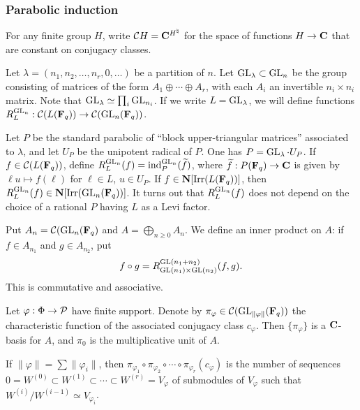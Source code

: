 \subsubsection{Parabolic induction}

For any finite group $H$, write $\mathcal{C} H=\mathbf{C}^{H^\natural}$ for the space of 
functions $H\to \mathbf{C}$ that are constant on conjugacy classes. 

Let $\lambda=(n_1,n_2,\dots,n_r,0,\dots)$ be a partition of $n$. 
Let $\operatorname{GL}_\lambda\subset \operatorname{GL}_n$ be the group consisting of 
matrices of the form $A_1\oplus \cdots \oplus A_r$, with each $A_i$ an 
invertible $n_i\times n_i$ matrix. Note that 
$\operatorname{GL}_\lambda\simeq \prod_i \operatorname{GL}_{n_i}$. If we write 
$L=\operatorname{GL}_\lambda$, we will define functions 
$R_L^{\operatorname{GL}_n}:\mathcal{C}(L(\mathbf{F}_q)) \to \mathcal{C}(\operatorname{GL}_n(\mathbf{F}_q))$. 

Let $P$ be the standard parabolic of ``block upper-triangular matrices'' 
associated to $\lambda$, and let $U_P$ be the unipotent radical of $P$. 
One has $P=\operatorname{GL}_\lambda \cdot U_P$. If 
$f\in \mathcal{C}(L(\mathbf{F}_q))$, define 
$R_L^{\operatorname{GL}_n}(f)=\operatorname{ind}_P^{\operatorname{GL}_n}(\widetilde f)$, 
where $\widetilde f:P(\mathbf{F}_q) \to \mathbf{C}$ is given by 
$\ell u\mapsto f(\ell)$ for $\ell\in L$, $u\in U_P$. If 
$f\in \mathbf{N}[\operatorname{Irr}(L(\mathbf{F}_q))]$, then 
$R_L^{\operatorname{GL}_n}(f)\in \mathbf{N}[\operatorname{Irr}(\operatorname{GL}_n(\mathbf{F}_q))]$. 
It turns out that $R_L^{\operatorname{GL}_n}(f)$ does not depend on the choice of 
a rational $P$ having $L$ as a Levi factor. 

Put $A_n = \mathcal{C}(\operatorname{GL}_n(\mathbf{F}_q)$ and $A=\bigoplus_{n\geqslant 0} A_n$. 
We define an inner product on $A$: if 
$f\in A_{n_1}$ and $g\in A_{n_2}$, put 
\[
  f\circ g = R_{\operatorname{GL}(n_1)\times \operatorname{GL}(n_2)}^{\operatorname{GL}(n_1+n_2)}(f,g) .
\]
This is commutative and associative.  

Let $\varphi:\Phi\to \mathcal{P}$ have finite support. Denote by 
$\pi_\varphi\in \mathcal{C}(\operatorname{GL}_{\|\varphi\|}(\mathbf{F}_q))$ the characteristic 
function of the associated conjugacy class $c_\varphi$. Then 
$\{\pi_\varphi\}$ is a $\mathbf{C}$-basis for $A$, and $\pi_0$ is the multiplicative 
unit of $A$. 

\begin{lemm}
If $\|\varphi\| = \sum \| \varphi_i\|$, then 
$\pi_{\varphi_1}\circ \pi_{\varphi_2} \circ \cdots \circ \pi_{\varphi_r}(c_\varphi)$ 
is the number of sequences $0=W^{(0)}\subset W^{(1)} \subset \cdots \subset W^{(r)}=V_\varphi$ 
of submodules of $V_\varphi$ such that $W^{(i)}/W^{(i-1)} \simeq V_{\varphi_i}$. 
\end{lemm}

